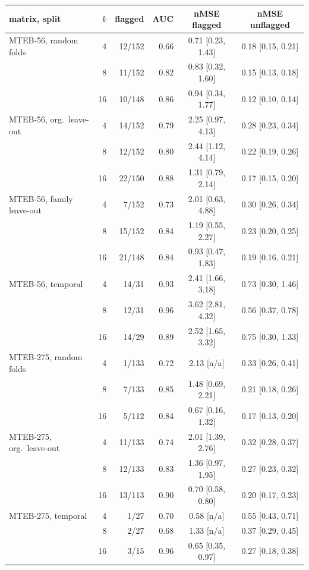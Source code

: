 \begin{tabular}{lrrrcc}
\toprule
matrix, split & $k$ & flagged & AUC & nMSE flagged & nMSE unflagged \\
\midrule
MTEB-56, random folds & 4 & 12/152 & 0.66 & 0.71 {\scriptsize[0.23, 1.43]} & 0.18 {\scriptsize[0.15, 0.21]} \\
 & 8 & 11/152 & 0.82 & 0.83 {\scriptsize[0.32, 1.60]} & 0.15 {\scriptsize[0.13, 0.18]} \\
 & 16 & 10/148 & 0.86 & 0.94 {\scriptsize[0.34, 1.77]} & 0.12 {\scriptsize[0.10, 0.14]} \\
\midrule
MTEB-56, org.\ leave-out & 4 & 14/152 & 0.79 & 2.25 {\scriptsize[0.97, 4.13]} & 0.28 {\scriptsize[0.23, 0.34]} \\
 & 8 & 12/152 & 0.80 & 2.44 {\scriptsize[1.12, 4.14]} & 0.22 {\scriptsize[0.19, 0.26]} \\
 & 16 & 22/150 & 0.88 & 1.31 {\scriptsize[0.79, 2.14]} & 0.17 {\scriptsize[0.15, 0.20]} \\
\midrule
MTEB-56, family leave-out & 4 & 7/152 & 0.73 & 2.01 {\scriptsize[0.63, 4.88]} & 0.30 {\scriptsize[0.26, 0.34]} \\
 & 8 & 15/152 & 0.84 & 1.19 {\scriptsize[0.55, 2.27]} & 0.23 {\scriptsize[0.20, 0.25]} \\
 & 16 & 21/148 & 0.84 & 0.93 {\scriptsize[0.47, 1.83]} & 0.19 {\scriptsize[0.16, 0.21]} \\
\midrule
MTEB-56, temporal & 4 & 14/31 & 0.93 & 2.41 {\scriptsize[1.66, 3.18]} & 0.73 {\scriptsize[0.30, 1.46]} \\
 & 8 & 12/31 & 0.96 & 3.62 {\scriptsize[2.81, 4.32]} & 0.56 {\scriptsize[0.37, 0.78]} \\
 & 16 & 14/29 & 0.89 & 2.52 {\scriptsize[1.65, 3.32]} & 0.75 {\scriptsize[0.30, 1.33]} \\
\midrule
MTEB-275, random folds & 4 & 1/133 & 0.72 & 2.13 {\scriptsize[n/a]} & 0.33 {\scriptsize[0.26, 0.41]} \\
 & 8 & 7/133 & 0.85 & 1.48 {\scriptsize[0.69, 2.21]} & 0.21 {\scriptsize[0.18, 0.26]} \\
 & 16 & 5/112 & 0.84 & 0.67 {\scriptsize[0.16, 1.32]} & 0.17 {\scriptsize[0.13, 0.20]} \\
\midrule
MTEB-275, org.\ leave-out & 4 & 11/133 & 0.74 & 2.01 {\scriptsize[1.39, 2.76]} & 0.32 {\scriptsize[0.28, 0.37]} \\
 & 8 & 12/133 & 0.83 & 1.36 {\scriptsize[0.97, 1.95]} & 0.27 {\scriptsize[0.23, 0.32]} \\
 & 16 & 13/113 & 0.90 & 0.70 {\scriptsize[0.58, 0.80]} & 0.20 {\scriptsize[0.17, 0.23]} \\
\midrule
MTEB-275, temporal & 4 & 1/27 & 0.70 & 0.58 {\scriptsize[n/a]} & 0.55 {\scriptsize[0.43, 0.71]} \\
 & 8 & 2/27 & 0.68 & 1.33 {\scriptsize[n/a]} & 0.37 {\scriptsize[0.29, 0.45]} \\
 & 16 & 3/15 & 0.96 & 0.65 {\scriptsize[0.35, 0.97]} & 0.27 {\scriptsize[0.18, 0.38]} \\
\bottomrule
\end{tabular}
